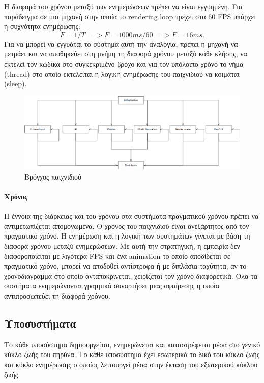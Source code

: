 	Η διαφορά του χρόνου μεταξύ των ενημερώσεων πρέπει να είναι εγγυημένη. Για παράδειγμα σε μια μηχανή στην οποία το rendering loop τρέχει στα 60 \gls{FPS} υπάρχει η συχνότητα ενημέρωσης:
	\begin{equation}
	 F = 1/T =>  F = 1000ms/60 => F = 16ms. 
	\end{equation}
	Για να μπορεί να εγγυάται το σύστημα αυτή την αναλογία, πρέπει η μηχανή να μετράει και να αποθηκεύει στη μνήμη τη διαφορά χρόνου μεταξύ κάθε κλήσης, να εκτελεί τον κώδικα στο συγκεκριμένο βρόχο και για τον υπόλοιπο χρόνο το νήμα (thread) στο οποίο εκτελείται η λογική ενημέρωσης του παιχνιδιού να κοιμάται (sleep).
	
	\begin{figure}[h!]
		\centering
		\includegraphics[width=160mm]{Images/gameloops_update}
		\caption{Βρόγχος παιχνιδιού}
		\label{fig:gameloops}
	\end{figure}
		
	\paragraph{Χρόνος}
	Η έννοια της διάρκειας και του χρόνου στα συστήματα πραγματικού χρόνου πρέπει να αντιμετωπίζεται απομονωμένα. Ο χρόνος του παιχνιδιού  είναι ανεξάρτητος από τον πραγματικό χρόνο. Η ενημέρωση και η λογική των συστημάτων γίνεται με βάση τη διαφορά χρόνου μεταξύ ενημερώσεων. Με αυτή την στρατηγική, η εμπειρία δεν διαφοροποιείται με λιγότερα \gls{FPS} και ένα animation το οποίο αποδίδεται σε πραγματικό χρόνο, μπορεί να αποδοθεί αντίστροφα ή με διπλάσια ταχύτητα, αν το χρονοδιάγραμμα στο οποίο ανταποκρίνεται, χειρίζεται τον χρόνο διαφορετικά.
	Όλα τα συστήματα ενημερώνονται γραμμικά συναρτήσει μιας αφαίρεσης η οποία αντιπροσωπεύει τη διαφορά χρόνου.
	\subsection{Υποσυστήματα}
	Το κάθε υποσύστημα δημιουργείται, ενημερώνεται και καταστρέφεται μέσα στο γενικό κύκλο ζωής του πηρύνα. Το κάθε υποσύστημα έχει εσωτερικά το δικό του κύκλο ζωής και κύκλο ενημέρωσης ο οποίος λειτουργεί μέσα στην έκταση του εξωτερικού κύκλου ζωής.
	
